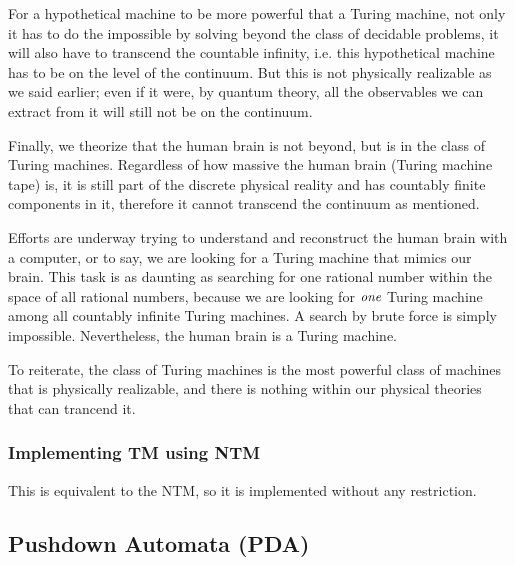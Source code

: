 \documentclass[12pt]{article}  %
\begin{document}
For a hypothetical machine to be more powerful that a Turing machine, not only it has to do the impossible by solving beyond the class of decidable problems, it will also have to transcend the countable infinity, i.e. this hypothetical machine has to be on the level of the continuum. But this is not physically realizable as we said earlier; even if it were, by quantum theory, all the observables we can extract from it will still not be on the continuum.

Finally, we theorize that the human brain is not beyond, but is in the class of Turing machines. Regardless of how massive the human brain (Turing machine tape) is, it is still part of the discrete physical reality and has countably finite components in it, therefore it cannot transcend the continuum as mentioned.

Efforts are underway trying to understand and reconstruct the human brain with a computer, or to say, we are looking for a Turing machine that mimics our brain. This task is as daunting as searching for one rational number within the space of all rational numbers, because we are looking for $\emph{one}$ Turing machine among all countably infinite Turing machines. A search by brute force is simply impossible. Nevertheless, the human brain is a Turing machine.

To reiterate, the class of Turing machines is the most powerful class of machines that is physically realizable, and there is nothing within our physical theories that can trancend it.




\subsubsection{Implementing TM using NTM}
This is equivalent to the NTM, so it is implemented without any restriction.





\subsection{Pushdown Automata (PDA)}
\end{document}
